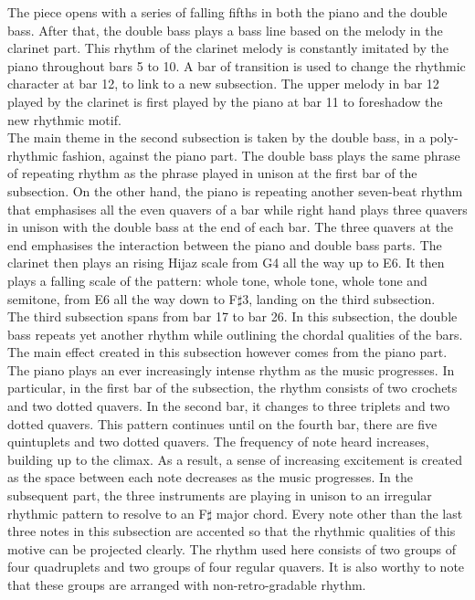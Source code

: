 \documentclass{article}
\begin{document}
The piece opens with a series of falling fifths in both the piano and the
double bass. After that, the double bass plays a bass line based on the melody
in the clarinet part. This rhythm of the clarinet melody is constantly imitated
by the piano throughout bars 5 to 10. A bar of transition is used to change the
rhythmic character at bar 12, to link to a new subsection. The upper melody in
bar 12 played by the clarinet is first played by the piano at bar 11 to
foreshadow the new rhythmic motif.\\

The main theme in the second subsection is taken by the double bass, in a
poly-rhythmic fashion, against the piano part. The double bass plays the same
phrase of repeating rhythm as the phrase played in unison at the first bar of
the subsection. On the other hand, the piano is repeating another seven-beat
rhythm that emphasises all the even quavers of a bar while right hand plays
three quavers in unison with the double bass at the end of each bar. The three
quavers at the end emphasises the interaction between the piano and double bass
parts. The clarinet then plays an rising Hijaz scale from G4 all the way up to
E6. It then plays a falling scale of the pattern: whole tone, whole tone, whole
tone and semitone, from E6 all the way down to F\(\sharp\)3, landing on the
third subsection.\\

The third subsection spans from bar 17 to bar 26. In this subsection, the
double bass repeats yet another rhythm while outlining the chordal qualities of
the bars. The main effect created in this subsection however comes from the
piano part. The piano plays an ever increasingly intense rhythm as the music
progresses. In particular, in the first bar of the subsection, the rhythm
consists of two crochets and two dotted quavers. In the second bar, it changes
to three triplets and two dotted quavers. This pattern continues until on the
fourth bar, there are five quintuplets and two dotted quavers. The frequency of
note heard increases, building up to the climax. As a result, a sense of
increasing excitement is created as the space between each note decreases as
the music progresses. In the subsequent part, the three instruments are playing
in unison to an irregular rhythmic pattern to resolve to an F\(\sharp\) major
chord. Every note other than the last three notes in this subsection are
accented so that the rhythmic qualities of this motive can be projected
clearly. The rhythm used here consists of two groups of four quadruplets and two
groups of four regular quavers. It is also worthy to note that these groups are
arranged with non-retro-gradable rhythm.\\
\end{document}
